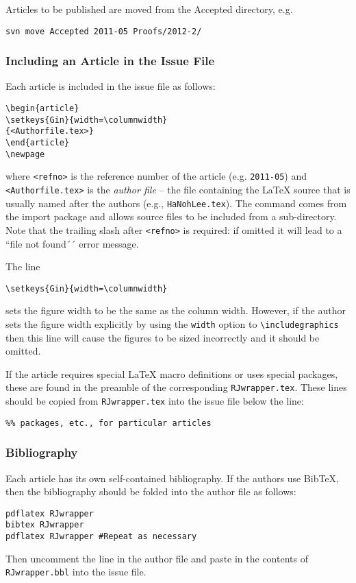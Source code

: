 \documentclass[11pt]{article}
\begin{document}
Articles to be published are moved from the Accepted directory, e.g.
\begin{verbatim}
svn move Accepted 2011-05 Proofs/2012-2/
\end{verbatim}

\subsubsection{Including an Article in the Issue File}

Each article is included in the issue file as follows:
\begin{verbatim}
\begin{article}
\setkeys{Gin}{width=\columnwidth}
{<Authorfile.tex>}
\end{article}
\newpage
\end{verbatim}
where \verb+<refno>+ is the reference number of the article
(e.g. \texttt{2011-05}) and \verb+<Authorfile.tex>+ is the {\em author
  file} -- the file containing the LaTeX source that is usually named
after the authors (e.g., \texttt{HaNohLee.tex}). The \verb++
command comes from the import package and allows source files to be
included from a sub-directory.  Note that the trailing slash after
\verb+<refno>+ is required: if omitted it will lead to a ``file not
found´´ error message.

The line 
\begin{verbatim}
\setkeys{Gin}{width=\columnwidth}
\end{verbatim}
sets the figure width to be the same as the column width. However, if
the author sets the figure width explicitly by using the
\texttt{width} option to \verb+\includegraphics+ then this line will
cause the figures to be sized incorrectly and it should be omitted.

If the article requires special LaTeX macro definitions or uses
special packages, these are found in the preamble of the
corresponding \texttt{RJwrapper.tex}. These lines should be copied
from \texttt{RJwrapper.tex} into the issue file below the line:
\begin{verbatim}
%% packages, etc., for particular articles 
\end{verbatim}

\subsubsection{Bibliography}

Each article has its own self-contained bibliography.  If the authors
use BibTeX, then the bibliography should be folded into the author file
as follows:
\begin{verbatim}
pdflatex RJwrapper
bibtex RJwrapper
pdflatex RJwrapper #Repeat as necessary
\end{verbatim}
Then uncomment the line \verb++ in the author
file and paste in the contents of \texttt{RJwrapper.bbl} into the
issue file.
\end{document}

